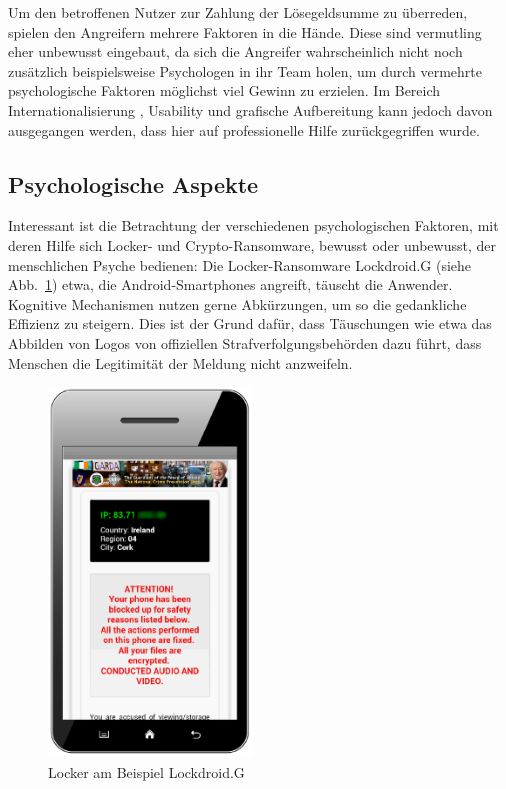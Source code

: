 Um den betroffenen Nutzer zur Zahlung der Lösegeldsumme zu überreden, spielen den Angreifern mehrere Faktoren in die Hände. Diese sind vermutling eher unbewusst eingebaut, da sich die Angreifer wahrscheinlich nicht noch zusätzlich beispielsweise Psychologen in ihr Team holen, um durch vermehrte psychologische Faktoren möglichst viel Gewinn zu erzielen. Im Bereich Internationalisierung \cite{faktoren:l18n}, Usability und grafische Aufbereitung \cite{faktoren:grafik} \cite{evolution} kann jedoch davon ausgegangen werden, dass hier auf professionelle Hilfe zurückgegriffen wurde.

\subsection{Psychologische Aspekte}

Interessant ist die Betrachtung der verschiedenen psychologischen Faktoren, mit deren Hilfe sich Locker- und Crypto-Ransomware, bewusst oder unbewusst, der menschlichen Psyche bedienen:
Die Locker-Ransomware \glqq Lockdroid.G\grqq{} (siehe Abb.~\ref{fig:lockdroid}) etwa, die Android-Smartphones angreift, täuscht die Anwender. Kognitive Mechanismen nutzen gerne Abkürzungen, um so die gedankliche Effizienz zu steigern. Dies ist der Grund dafür, dass Täuschungen wie etwa das Abbilden von Logos von offiziellen Strafverfolgungsbehörden dazu führt, dass Menschen die Legitimität der Meldung nicht anzweifeln. 

\begin{figure}
  \begin{center}
    \includegraphics[width=0.48\textwidth]{img/android_locker.png}
  \end{center}
  \caption{Locker am Beispiel \glqq Lockdroid.G\grqq{} \cite{evolution}}
  \label{fig:lockdroid}
\end{figure}

